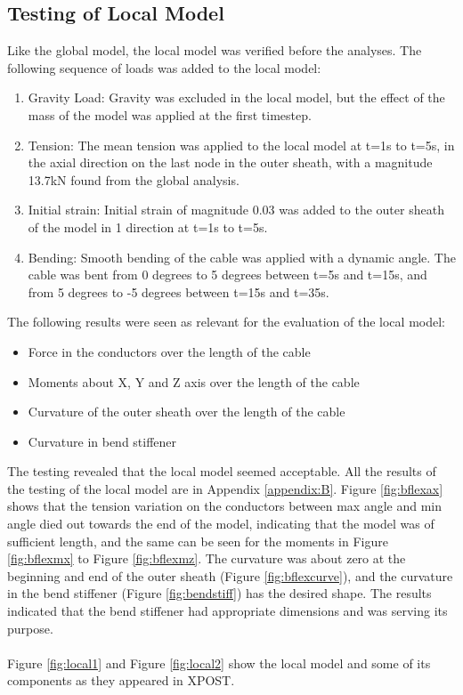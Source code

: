 \subsection{Testing of Local Model}
\label{sec:localtest}
Like the global model, the local model was verified before the analyses. The following sequence of loads was added to the local model:
\begin{enumerate}
    \item Gravity Load: Gravity was excluded in the local model, but the effect of the mass of the model was applied at the first timestep. 
    \item Tension: The mean tension was applied to the local model at t=1s to t=5s, in the axial direction on the last node in the outer sheath, with a magnitude 13.7kN found from the global analysis.
    \item Initial strain: Initial strain of magnitude 0.03 was added to the outer sheath of the model in 1 direction at t=1s to t=5s.
    \item Bending: Smooth bending of the cable was applied with a dynamic angle. The cable was bent from 0 degrees to 5 degrees between t=5s and t=15s, and from 5 degrees to -5 degrees between t=15s and t=35s.  
\end{enumerate}
The following results were seen as relevant for the evaluation of the local model:
\begin{itemize}
    \item Force in the conductors over the length of the cable
    \item Moments about X, Y and Z axis over the length of the cable
    \item Curvature of the outer sheath over the length of the cable
    \item Curvature in bend stiffener
\end{itemize}
The testing revealed that the local model seemed acceptable. All the results of the testing of the local model are in Appendix \ref{appendix:B}. Figure \ref{fig:bflexax} shows that the tension variation on the conductors between max angle and min angle died out towards the end of the model, indicating that the model was of sufficient length, and the same can be seen for the moments in Figure \ref{fig:bflexmx} to Figure \ref{fig:bflexmz}. The curvature was about zero at the beginning and end of the outer sheath (Figure \ref{fig:bflexcurve}), and the curvature in the bend stiffener (Figure \ref{fig:bendstiff}) has the desired shape. The results indicated that the bend stiffener had appropriate dimensions and was serving its purpose. \\\\
Figure \ref{fig:local1} and Figure \ref{fig:local2} show the local model and some of its components as they appeared in XPOST.

